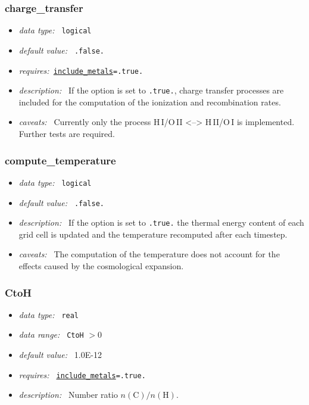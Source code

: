 \documentclass[a4paper,10pt]{article}
\begin{document}
\subsubsection{charge\_transfer}
\label{opt:chargetransfer}
\begin{itemize}
 \item \textit{data type:~} \texttt{logical}
 \item \textit{default value:~} \texttt{.false.}
 \item \textit{requires:~}\texttt{\hyperref[opt:includemetals]{include\_metals}=.true.}
 \item \textit{description:~}  If the option is set to \texttt{.true.}, 
  charge transfer processes are included for the computation of the ionization
  and recombination rates.
 \item \textit{caveats:~} Currently only the process H\,I/O\,II <--> H\,II/O\,I
 is implemented. Further tests are required.
\end{itemize}


\subsubsection{compute\_temperature}
\label{opt:computetemperature}
\begin{itemize}
 \item \textit{data type:~} \texttt{logical}
 \item \textit{default value:~} \texttt{.false.}
 \item \textit{description:~}  If the option is set to \texttt{.true.} the  
  thermal energy content of each grid cell is updated and the temperature 
  recomputed after each timestep. 
 \item \textit{caveats:~} The computation of the temperature does not account 
  for the effects caused by the cosmological expansion.
\end{itemize}


\subsubsection{CtoH}
\label{opt:ctoh}
\begin{itemize}
 \item \textit{data type:~} \texttt{real}
 \item \textit{data range:~}  \texttt{CtoH} $> 0$
 \item \textit{default value:~} 1.0E-12
 \item \textit{requires:~} \texttt{\hyperref[opt:abundreltoh]{include\_metals}=.true.}
 \item \textit{description:~} Number ratio $n(\mathrm{C})/n(\mathrm{H})$.
\end{itemize}
\end{document}
